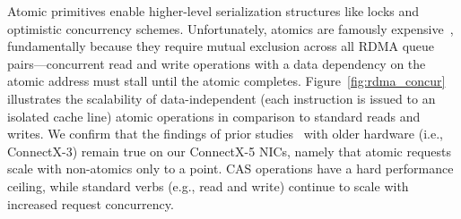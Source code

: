 Atomic primitives enable higher-level serialization structures like locks and
optimistic concurrency schemes. Unfortunately, atomics are famously
expensive~\cite{design-guidelines}, fundamentally because they require mutual
exclusion across all RDMA queue pairs---concurrent read and write operations with a data dependency on the atomic
address must stall until the atomic completes.
%
%
Figure~\ref{fig:rdma_concur} illustrates the scalability of
data-independent (each instruction is issued to an isolated cache
line) atomic operations in comparison to standard reads and writes.
We confirm that the findings of prior
studies~\cite[Fig. 14]{design-guidelines} with older hardware (i.e.,
ConnectX-3) remain true on our ConnectX-5 NICs, namely that atomic
requests scale with non-atomics only to a point.  CAS operations have
a hard performance ceiling, while standard verbs (e.g., read and
write) continue to scale with increased request concurrency.

%
%
%





